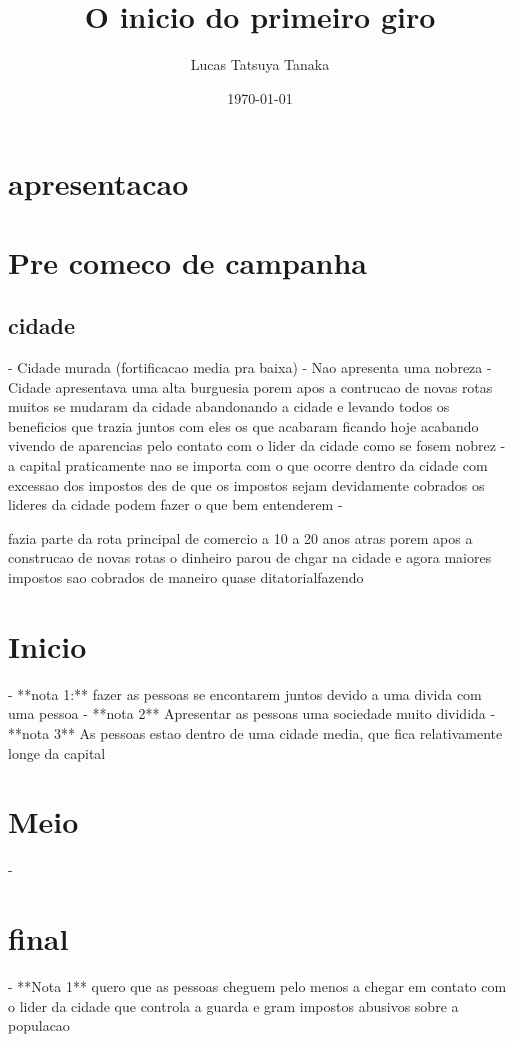 \documentclass{book}
\title{O inicio do primeiro giro}
\author{Lucas Tatsuya Tanaka}
\date{\today}
\begin{document}
\maketitle
\tableofcontents

 \chapter{apresentacao}
 \chapter{Pre comeco de campanha}
 \section{cidade}

- Cidade murada (fortificacao media pra baixa)
- Nao apresenta uma nobreza 
- Cidade apresentava uma alta burguesia porem apos a contrucao de novas rotas muitos se mudaram da cidade abandonando a cidade e levando todos os beneficios que trazia juntos com eles os que acabaram ficando hoje acabando vivendo de aparencias pelo contato com o lider da cidade como se fosem nobrez 
- a capital praticamente nao se importa com o que ocorre dentro da cidade com excessao dos impostos des de que os impostos sejam devidamente cobrados os lideres da cidade podem fazer o que bem entenderem 
- 

fazia parte da rota principal de comercio a 10 a 20  anos atras porem apos  a construcao de novas rotas o dinheiro parou de chgar na cidade e agora maiores impostos sao cobrados de maneiro quase ditatorialfazendo

\chapter{Inicio}

- **nota 1:** fazer as pessoas se encontarem juntos devido a uma divida com uma pessoa 
- **nota 2** Apresentar as pessoas uma sociedade muito dividida 
- **nota 3** As pessoas estao dentro de uma cidade media, que fica relativamente longe da capital

\chapter{Meio}

- 

\chapter{final}

- **Nota 1** quero que as pessoas cheguem pelo menos a chegar em contato com o lider da cidade que controla a guarda e gram impostos abusivos sobre a populacao    
\end{document}
